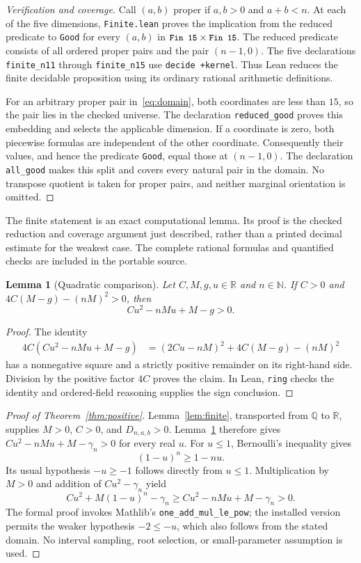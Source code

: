 \documentclass[11pt]{article}
\newtheorem{lemma}[theorem]{Lemma}
\newcommand{\Q}{\mathbb{Q}}
\newcommand{\R}{\mathbb{R}}
\newcommand{\N}{\mathbb{N}}
\newcommand{\code}[1]{\texttt{\small #1}}
\begin{document}
\begin{proof}[Verification and coverage]
Call $(a,b)$ proper if $a,b>0$ and $a+b<n$. At each of the five
dimensions, \code{Finite.lean} proves the implication from the reduced
predicate to \code{Good} for every $(a,b)$ in
$\code{Fin 15}\times\code{Fin 15}$. The reduced predicate consists
of all ordered proper pairs and the pair $(n-1,0)$.
The five declarations \code{finite\_n11} through \code{finite\_n15}
use \code{decide +kernel}. Thus Lean reduces the finite decidable
proposition using its ordinary rational arithmetic definitions.

For an arbitrary proper pair in~\eqref{eq:domain}, both coordinates
are less than $15$, so the pair lies in the checked universe. The
declaration \code{reduced\_good} proves this embedding and selects the
applicable dimension. If a coordinate is zero, both piecewise formulas
are independent of the other coordinate. Consequently their values,
and hence the predicate \code{Good}, equal those at $(n-1,0)$.
The declaration \code{all\_good} makes this split and covers every
natural pair in the domain. No transpose quotient is taken for proper
pairs, and neither marginal orientation is omitted.
\end{proof}

The finite statement is an exact computational lemma. Its proof is the
checked reduction and coverage argument just described, rather than
a printed decimal estimate for the weakest case. The complete rational
formulas and quantified checks are included in the portable source.

\begin{lemma}[Quadratic comparison]\label{lem:quadratic}
Let $C,M,g,u\in\R$ and $n\in\N$. If $C>0$ and
$4C(M-g)-(nM)^2>0$, then
\[
 Cu^2-nMu+M-g>0.
\]
\end{lemma}

\begin{proof}
The identity
\begin{align*}
 4C(Cu^2-nMu+M-g)
 &= (2Cu-nM)^2+4C(M-g)-(nM)^2
\end{align*}
has a nonnegative square and a strictly positive remainder on its
right-hand side. Division by the positive factor $4C$ proves the claim.
In Lean, \code{ring} checks the identity and ordered-field reasoning
supplies the sign conclusion.
\end{proof}

\begin{proof}[Proof of Theorem~\ref{thm:positive}]
Lemma~\ref{lem:finite}, transported from $\Q$ to $\R$, supplies
$M>0$, $C>0$, and $D_{n,a,b}>0$. Lemma~\ref{lem:quadratic} therefore
gives $Cu^2-nMu+M-\gamma_n>0$ for every real $u$.
For $u\leq 1$, Bernoulli's inequality gives
\[
 (1-u)^n\geq 1-nu.
\]
Its usual hypothesis $-u\geq-1$ follows directly from $u\leq1$.
Multiplication by $M>0$ and addition of $Cu^2-\gamma_n$ yield
\[
 Cu^2+M(1-u)^n-\gamma_n
 \geq Cu^2-nMu+M-\gamma_n>0.
\]
The formal proof invokes Mathlib's \code{one\_add\_mul\_le\_pow};
the installed version permits the weaker hypothesis $-2\leq -u$,
which also follows from the stated domain. No interval sampling,
root selection, or small-parameter assumption is used.
\end{proof}
\end{document}
